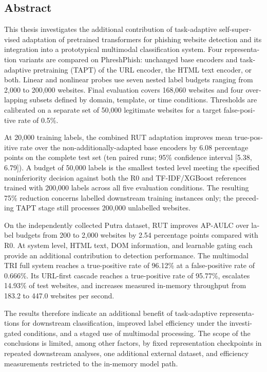 \clearpage
\begin{otherlanguage}{english}
\chapter*{Abstract}
This thesis investigates the additional contribution of task-adaptive self-supervised adaptation
of pretrained transformers for phishing website detection and its integration into a prototypical
multimodal classification system. Four representation variants are compared on PhreshPhish:
unchanged base encoders and task-adaptive pretraining (TAPT) of the URL encoder, the HTML
text encoder, or both. Linear and nonlinear probes use seven nested label budgets ranging from
2,000 to 200,000 websites. Final evaluation covers 168,060 websites and four overlapping
subsets defined by domain, template, or time conditions. Thresholds are calibrated on a separate
set of 50,000 legitimate websites for a target false-positive rate of 0.5\%.

At 20,000 training labels, the combined RUT adaptation improves mean true-positive rate over
the non-additionally-adapted base encoders by 6.08 percentage points on the complete test set
(ten paired runs; 95\% confidence interval [5.38, 6.79]). A budget of 50,000 labels is the
smallest tested level meeting the specified noninferiority decision against both the R0 and
TF-IDF/XGBoost references trained with 200,000 labels across all five evaluation conditions.
The resulting 75\% reduction concerns labelled downstream training instances only; the
preceding TAPT stage still processes 200,000 unlabelled websites.

On the independently collected Putra dataset, RUT improves AP-AULC over label budgets from
200 to 2,000 websites by 2.54 percentage points compared with R0. At system level, HTML text,
DOM information, and learnable gating each provide an additional contribution to detection
performance. The multimodal TRI full system reaches a true-positive rate of 96.12\% at a
false-positive rate of 0.666\%. Its URL-first cascade reaches a true-positive rate of 95.77\%,
escalates 14.93\% of test websites, and increases measured in-memory throughput from 183.2
to 447.0 websites per second.

The results therefore indicate an additional benefit of task-adaptive representations for
downstream classification, improved label efficiency under the investigated conditions, and a
staged use of multimodal processing. The scope of the conclusions is limited, among other
factors, by fixed representation checkpoints in repeated downstream analyses, one additional
external dataset, and efficiency measurements restricted to the in-memory model path.
\end{otherlanguage}
\clearpage
